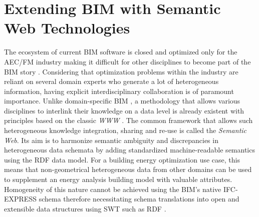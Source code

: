 \section{Extending \ac{BIM} with Semantic Web Technologies}
\label{Semantic Web}
The ecosystem of current BIM software is closed and optimized only for the \ac{AEC/FM} industry making it difficult for other disciplines to become part of the BIM story \citep{Jeroen2018}. Considering that optimization problems within the industry are reliant on several domain experts who generate a lot of heterogeneous information, having explicit interdisciplinary collaboration is of paramount importance. Unlike domain-specific \ac{BIM} \citep{Pauwels}, a methodology that allows various disciplines to interlink their knowledge on a data level is already existent with principles based on the classic 
\textit{\ac{WWW}} \citep{Berners-Lee2001a, Berners-Lee2001}. The common framework that allows such heterogeneous knowledge integration, sharing and re-use is called the \textit{Semantic Web}. Its aim is to harmonize semantic ambiguity and discrepancies in heterogeneous data schemata by adding standardized machine-readable semantics \citep{Barbau2012} using the \ac{RDF} data model. For a building energy optimization use case, this means that non-geometrical heterogeneous data from other domains can be used to supplement an energy analysis building model with valuable attributes. Homogeneity of this nature cannot be achieved using the \ac{BIM}'s native \ac{IFC}-EXPRESS schema therefore necessitating schema translations into open and extensible data structures using \acf{SWT} such as \ac{RDF} \citep{Pan2004, Pauwels2010, Yang2006}. 

